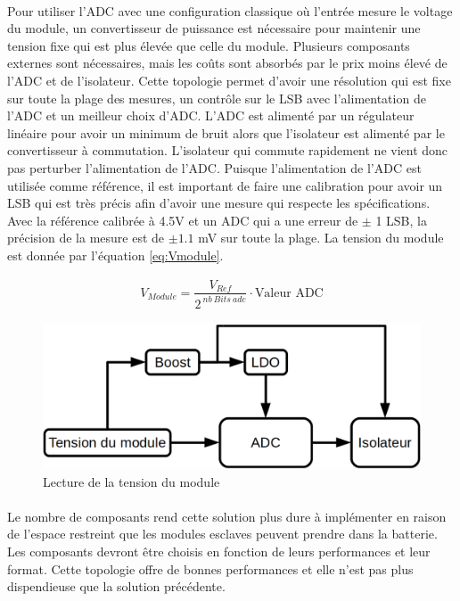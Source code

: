 	\paragraph*{}
	Pour utiliser l'ADC avec une configuration classique où l'entrée mesure le voltage du module, un convertisseur de puissance est nécessaire pour maintenir une tension fixe qui est plus élevée que celle du module. Plusieurs composants externes sont nécessaires, mais les coûts sont absorbés par le prix moins élevé de l'ADC et de l'isolateur. Cette topologie permet d'avoir une résolution qui est fixe sur toute la plage des mesures, un contrôle sur le LSB avec l'alimentation de l'ADC et un meilleur choix d'ADC. L'ADC est alimenté par un régulateur linéaire pour avoir un minimum de bruit alors que l'isolateur est alimenté par le convertisseur à commutation. L'isolateur qui commute rapidement ne vient donc pas perturber l'alimentation de l'ADC. Puisque l'alimentation de l'ADC  est utilisée comme référence, il est important de faire une calibration pour avoir un LSB qui est très précis afin d'avoir une mesure qui respecte les spécifications. Avec la référence calibrée à 4.5V et un ADC qui a une erreur de $\pm$ 1 LSB, la précision de la mesure est de $\pm 1.1$ mV sur toute la plage. La tension du module est donnée par l'équation \ref{eq:Vmodule}.
	
	\begin{align}
		V_{Module} = \dfrac{V_{Ref}}{2^{~nb~Bits~adc}} \cdot \text{Valeur ADC}
		\label{eq:Vmodule}
	\end{align}
	
	\begin{figure}[H]
		\centering
		\includegraphics[scale=0.3]{Images/Tension_module.png}
		\caption{Lecture de la tension du module}
		\label{fig:adc_vmod}
	\end{figure}	

	\paragraph*{}
	Le nombre de composants rend cette solution plus dure à implémenter en raison de l'espace restreint que les modules esclaves peuvent prendre dans la batterie. Les composants devront être choisis en fonction de leurs performances et leur format. Cette topologie offre de bonnes performances et elle n'est pas plus dispendieuse que la solution précédente. 
	
